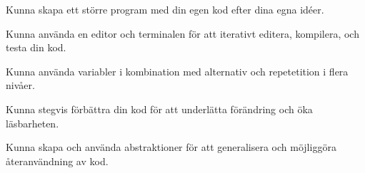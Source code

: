 
\item Kunna skapa ett större program med din egen kod efter dina egna idéer.
\item Kunna använda en editor och terminalen för att iterativt editera, kompilera, och testa din kod.
\item Kunna använda variabler i kombination med alternativ och repetetition i flera nivåer.
\item Kunna stegvis förbättra din kod för att underlätta förändring och öka läsbarheten.
\item Kunna skapa och använda abstraktioner för att generalisera och möjliggöra återanvändning av kod.
